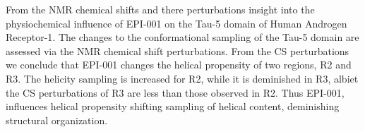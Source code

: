 From the NMR chemical shifts and there perturbations insight into the physiochemical influence of EPI-001 on the Tau-5 domain of Human Androgen Receptor-1. The changes to the conformational sampling of the Tau-5 domain are assessed via the NMR chemical shift perturbations. From the CS perturbations we conclude that EPI-001 changes the helical propensity of two regions, R2 and R3. The helicity sampling is increased for R2, while it is deminished in R3, albiet the CS perturbations of R3 are less than those observed in R2. Thus EPI-001, influences helical propensity shifting sampling of helical content, deminishing structural organization.  